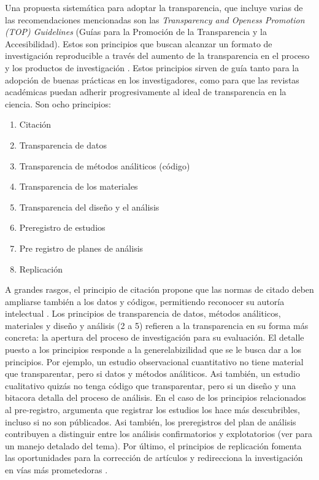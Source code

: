 \documentclass[
]{book}
\providecommand{\tightlist}{%
  \setlength{\itemsep}{0pt}\setlength{\parskip}{0pt}}
\begin{document}
Una propuesta sistemática para adoptar la transparencia, que incluye varias de las recomendaciones mencionadas son las \emph{Transparency and Openess Promotion (TOP) Guidelines} (Guías para la Promoción de la Transparencia y la Accesibilidad). Estos son principios que buscan alcanzar un formato de investigación reproducible a través del aumento de la transparencia en el proceso y los productos de investigación \citep{nosek_Transparency_2014}. Estos principios sirven de guía tanto para la adopción de buenas prácticas en los investigadores, como para que las revistas académicas puedan adherir progresivamente al ideal de transparencia en la ciencia. Son ocho principios:

\begin{enumerate}
\def\labelenumi{\arabic{enumi}.}
\tightlist
\item
  Citación
\item
  Transparencia de datos
\item
  Transparencia de métodos análiticos (código)
\item
  Transparencia de los materiales
\item
  Transparencia del diseño y el análisis
\item
  Preregistro de estudios
\item
  Pre registro de planes de análisis
\item
  Replicación
\end{enumerate}

A grandes rasgos, el principio de citación propone que las normas de citado deben ampliarse también a los datos y códigos, permitiendo reconocer su autoría intelectual \citep{nosek_Promoting_2015}. Los principios de transparencia de datos, métodos análiticos, materiales y diseño y análisis (2 a 5) refieren a la transparencia en su forma más concreta: la apertura del proceso de investigación para su evaluación. El detalle puesto a los principios responde a la generelabizilidad que se le busca dar a los principios. Por ejemplo, un estudio observacional cuantitativo no tiene material que transparentar, pero si datos y métodos análiticos. Asi también, un estudio cualitativo quizás no tenga código que transparentar, pero si un diseño y una bitacora detalla del proceso de análisis. En el caso de los principios relacionados al pre-registro, \citet{nosek_Promoting_2015} argumenta que registrar los estudios los hace más descubribles, incluso si no son públicados. Asi también, los preregistros del plan de análisis contribuyen a distinguir entre los análisis confirmatorios y explotatorios (ver \citet{nosek_preregistration_2018} para un manejo detalado del tema). Por último, el principios de replicación fomenta las oportunidades para la corrección de artículos y redirecciona la investigación en vías más prometedoras \citep{nosek_Promoting_2015}.
\end{document}
